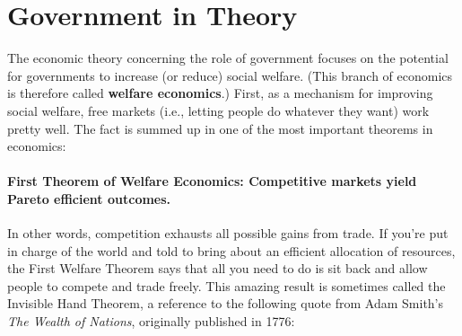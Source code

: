 \chapter{Government in Theory}


\begin{comment}

What Government Should Do

The role of government is to maximize societal welfare. But what is society welfare?

Sort of like cake-cutting.

Social Welfare Functions: What is the best thing to do?
Utilitarian
Weighted Utilitarian
Rawlsian



Welfare Theorems




Is B better than A?

Options: 
Pareto improvement
Kaldor-Hicks improvement (cost-benefit analysis)


\end{comment}



The economic theory concerning the role of government focuses on the potential for governments to increase (or reduce) social welfare. (This branch of economics is therefore called \textbf{welfare economics}.) First, as a mechanism for improving social welfare, free markets (i.e., letting people do whatever they want) work pretty well. The fact is summed up in one of the most important theorems in economics:

 
\subsubsection*{First Theorem of Welfare Economics: \rm Competitive markets yield Pareto efficient outcomes.} 

In other words, competition exhausts all possible gains from trade. If you're put in charge of the world and told to bring about an efficient allocation of resources, the First Welfare Theorem says that all you need to do is sit back and allow people to compete and trade freely. This amazing result is sometimes called the Invisible Hand Theorem, a reference to the following quote from Adam Smith's \emph{The Wealth of Nations}, originally published in 1776:

